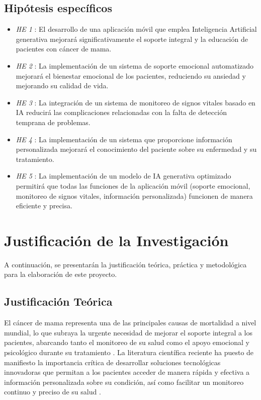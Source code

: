\subsection{Hipótesis específicos}
 \begin{itemize}
         \item \textit{HE 1} : El desarrollo de una aplicación móvil que emplea Inteligencia Artificial generativa mejorará significativamente el soporte integral y la educación de pacientes con cáncer de mama.
         \item \textit{HE 2} : La implementación de un sistema de soporte emocional automatizado mejorará el bienestar emocional de los pacientes, reduciendo su ansiedad y mejorando su calidad de vida.
         \item \textit{HE 3} : La integración de un sistema de monitoreo de signos vitales basado en IA reducirá las complicaciones relacionadas con la falta de detección temprana de problemas.
         \item \textit{HE 4} : La implementación de un sistema que proporcione información personalizada mejorará el conocimiento del paciente sobre su enfermedad y su tratamiento.
         \item \textit{HE 5} : La implementación de un modelo de IA generativa optimizado permitirá que todas las funciones de la aplicación móvil (soporte emocional, monitoreo de signos vitales, información personalizada) funcionen de manera eficiente y precisa.
         

\end{itemize}

\section{Justificación de la Investigación}
A continuación, se presentarán la justificación teórica, práctica y metodológica para la elaboración de este proyecto.
\subsection{Justificación Teórica}
El cáncer de mama representa una de las principales causas de mortalidad a nivel mundial, lo que subraya la urgente necesidad de mejorar el soporte integral a los pacientes, abarcando tanto el monitoreo de su salud como el apoyo emocional y psicológico durante su tratamiento \parencite{pascucci2021}. La literatura científica reciente ha puesto de manifiesto la importancia crítica de desarrollar soluciones tecnológicas innovadoras que permitan a los pacientes acceder de manera rápida y efectiva a información personalizada sobre su condición, así como facilitar un monitoreo continuo y preciso de su salud \parencite{okolo2024}.

